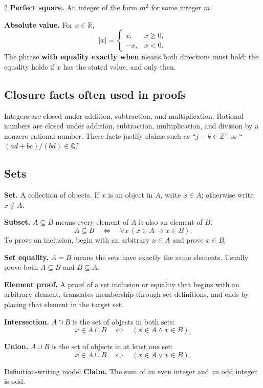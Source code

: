 \documentclass[10pt]{article}
\newcommand{\term}[1]{\textbf{\color{ProofNavy}#1}}
\newcommand{\Z}{\mathbb Z}
\newcommand{\Q}{\mathbb Q}
\newcommand{\R}{\mathbb R}
\begin{document}
\begin{multicols}{2}
\term{Perfect square.} An integer of the form $m^2$ for some integer $m$.

\term{Absolute value.} For $x\in\R$,
\[
 |x|=\begin{cases}
 x,&x\ge0,\\
 -x,&x<0.
 \end{cases}
\]
The phrase \term{with equality exactly when} means both directions must hold:
the equality holds if $x$ has the stated value, and only then.

\subsection*{Closure facts often used in proofs}
Integers are closed under addition, subtraction, and multiplication. Rational
numbers are closed under addition, subtraction, multiplication, and division by
a nonzero rational number. These facts justify claims such as ``$j-k\in\Z$''
or ``$(ad+bc)/(bd)\in\Q$.''

\columnbreak
\subsection*{Sets}

\term{Set.} A collection of objects. If $x$ is an object in $A$, write
$x\in A$; otherwise write $x\notin A$.

\term{Subset.} $A\subseteq B$ means every element of $A$ is also an element of
$B$:
\[
 A\subseteq B\quad\Longleftrightarrow\quad
 \forall x\,(x\in A\to x\in B).
\]
To prove an inclusion, begin with an arbitrary $x\in A$ and prove $x\in B$.

\term{Set equality.} $A=B$ means the sets have exactly the same elements.
Usually prove both $A\subseteq B$ and $B\subseteq A$.

\term{Element proof.} A proof of a set inclusion or equality that begins with
an arbitrary element, translates membership through set definitions, and ends
by placing that element in the target set.

\term{Intersection.} $A\cap B$ is the set of objects in both sets:
\[
 x\in A\cap B\quad\Longleftrightarrow\quad
 (x\in A\land x\in B).
\]

\term{Union.} $A\cup B$ is the set of objects in at least one set:
\[
 x\in A\cup B\quad\Longleftrightarrow\quad
 (x\in A\lor x\in B).
\]

\begin{workedbox}{Definition-writing model}
\textbf{Claim.} The sum of an even integer and an odd integer is odd.


\end{workedbox}
\end{multicols}
\end{document}
